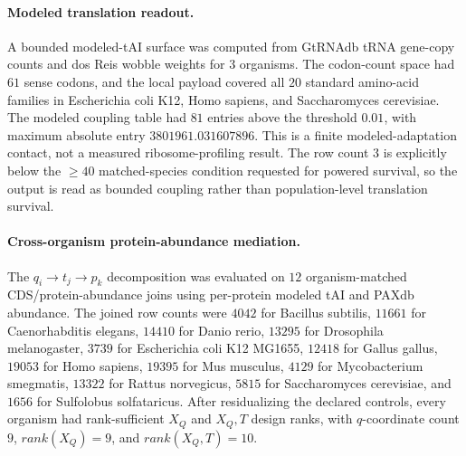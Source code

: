 \paragraph{Modeled translation readout.}
A bounded modeled-tAI surface was computed from GtRNAdb tRNA gene-copy counts and dos Reis wobble weights for $3$ organisms. The codon-count space had $61$ sense codons, and the local payload covered all $20$ standard amino-acid families in Escherichia coli K12, Homo sapiens, and Saccharomyces cerevisiae. The modeled coupling table had $81$ entries above the threshold $0.01$, with maximum absolute entry $3801961.031607896$. This is a finite modeled-adaptation contact, not a measured ribosome-profiling result. The row count $3$ is explicitly below the $\geq 40$ matched-species condition requested for powered survival, so the output is read as bounded coupling rather than population-level translation survival.

\paragraph{Cross-organism protein-abundance mediation.}
The $q_i\to t_j\to p_k$ decomposition was evaluated on $12$ organism-matched CDS/protein-abundance joins using per-protein modeled tAI and PAXdb abundance. The joined row counts were $4042$ for Bacillus subtilis, $11661$ for Caenorhabditis elegans, $14410$ for Danio rerio, $13295$ for Drosophila melanogaster, $3739$ for Escherichia coli K12 MG1655, $12418$ for Gallus gallus, $19053$ for Homo sapiens, $19395$ for Mus musculus, $4129$ for Mycobacterium smegmatis, $13322$ for Rattus norvegicus, $5815$ for Saccharomyces cerevisiae, and $1656$ for Sulfolobus solfataricus. After residualizing the declared controls, every organism had rank-sufficient $X_Q$ and $X_Q,T$ design ranks, with $q$-coordinate count $9$, $rank(X_Q)=9$, and $rank(X_Q,T)=10$.


